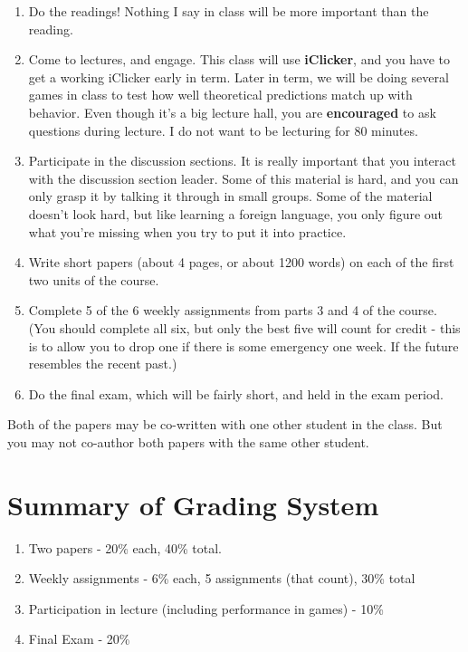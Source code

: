 \documentclass[
  12pt,
  letterpaper,
  DIV=11,
  numbers=noendperiod]{scrartcl}
\providecommand{\tightlist}{%
  \setlength{\itemsep}{0pt}\setlength{\parskip}{0pt}}\usepackage{longtable,booktabs,array}
\begin{document}
\begin{enumerate}
\def\labelenumi{\arabic{enumi}.}
\tightlist
\item
  Do the readings! Nothing I say in class will be more important than
  the reading.
\item
  Come to lectures, and engage. This class will use \textbf{iClicker},
  and you have to get a working iClicker early in term. Later in term,
  we will be doing several games in class to test how well theoretical
  predictions match up with behavior. Even though it's a big lecture
  hall, you are \textbf{encouraged} to ask questions during lecture. I
  do not want to be lecturing for 80 minutes.
\item
  Participate in the discussion sections. It is really important that
  you interact with the discussion section leader. Some of this material
  is hard, and you can only grasp it by talking it through in small
  groups. Some of the material doesn't look hard, but like learning a
  foreign language, you only figure out what you're missing when you try
  to put it into practice.
\item
  Write short papers (about 4 pages, or about 1200 words) on each of the
  first two units of the course.
\item
  Complete 5 of the 6 weekly assignments from parts 3 and 4 of the
  course. (You should complete all six, but only the best five will
  count for credit - this is to allow you to drop one if there is some
  emergency one week. If the future resembles the recent past.)
\item
  Do the final exam, which will be fairly short, and held in the exam
  period.
\end{enumerate}

Both of the papers may be co-written with one other student in the
class. But you may not co-author both papers with the same other
student.

\section{Summary of Grading System}\label{summary-of-grading-system}

\begin{enumerate}
\def\labelenumi{\arabic{enumi}.}
\tightlist
\item
  Two papers - 20\% each, 40\% total.
\item
  Weekly assignments - 6\% each, 5 assignments (that count), 30\% total
\item
  Participation in lecture (including performance in games) - 10\%
\item
  Final Exam - 20\%
\end{enumerate}
\end{document}
